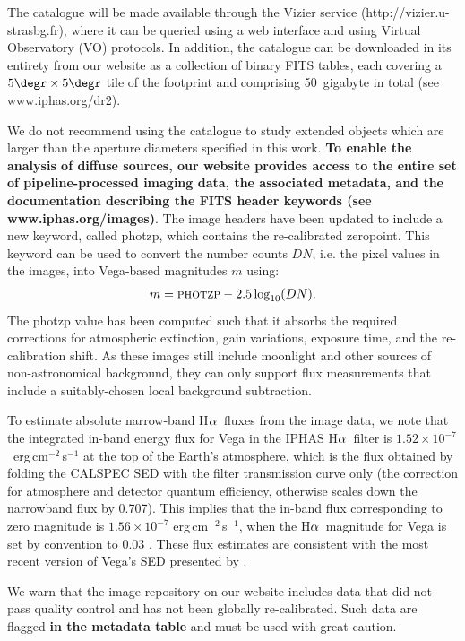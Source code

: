 \documentclass[a4paper,useAMS,usenatbib]{mn2e}
\def\ha{\mbox{H$\rm \alpha$}}
\begin{document}
The catalogue will be made available through the
Vizier service (http://vizier.u-strasbg.fr),
where it can be queried using a web interface
and using Virtual Observatory (VO) protocols.
In addition, the catalogue can be downloaded
in its entirety from our website
as a collection of binary FITS tables,
each covering a $5\degr\times5\degr$ tile
of the footprint and comprising 50~gigabyte
in total (see www.iphas.org/dr2).

We do not recommend using the catalogue
to study extended objects which
are larger than the
aperture diameters specified in this work.
{\bf To enable the analysis of diffuse sources,
our website provides access to the entire set
of pipeline-processed imaging data,
the associated metadata,
and the documentation describing the FITS header keywords
(see www.iphas.org/images)}.
The image headers have been updated to include
a new keyword, called {\sc photzp},
which contains the re-calibrated zeropoint.
This keyword can be used to convert the number counts $DN$,
i.e. the pixel values in the images,
into Vega-based magnitudes $m$ using:
\begin{equation}
\begin{split}
   m  = \textsc{photzp} - 2.5 \log_{10}(DN).
\label{eqn:mag}
\end{split}
\end{equation}
The {\sc photzp} value has been computed such that it
absorbs the required corrections for atmospheric extinction,
gain variations, exposure time, and the re-calibration shift.
As these images still include moonlight and other sources
of non-astronomical background, they can only support flux measurements
that include a suitably-chosen local background subtraction.

To estimate absolute narrow-band \ha\ fluxes from the image data,
we note that the integrated in-band energy flux for Vega 
in the IPHAS \ha\ filter 
is $1.52 \times 10^{-7}$~erg\,cm$^{-2}$\,s$^{-1}$ 
at the top of the Earth's atmosphere,
which is the flux obtained by folding the 
CALSPEC SED with the filter transmission curve only
(the correction for atmosphere and detector quantum efficiency,
otherwise scales down the narrowband flux by 0.707).
This implies that the in-band flux corresponding to
zero magnitude is $1.56 \times 10^{-7}$ erg\,cm$^{-2}$\,s$^{-1}$,
when the \ha\ magnitude for Vega is set by convention to 0.03 \citep{Fukugita1996}.
These flux estimates are consistent with the most recent
version of Vega's SED presented by \citet{Bohlin2014}.

We warn that the image repository on our website
includes data that did not pass quality control
and has not been globally re-calibrated.
Such data are flagged {\bf in the metadata table}
and must be used with great caution.
\end{document}
